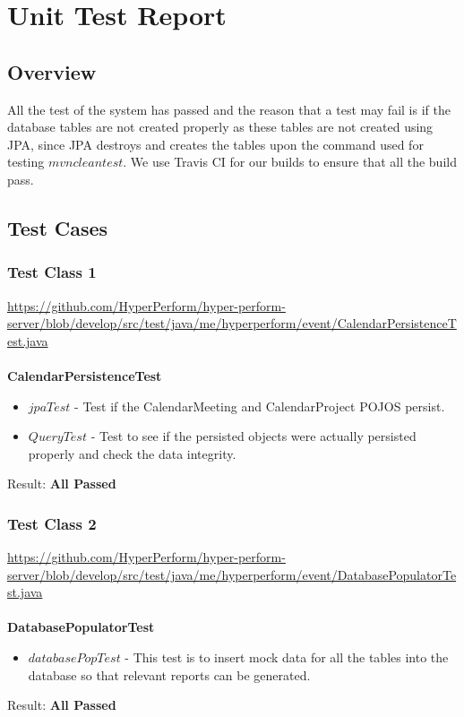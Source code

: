 \documentclass[11pt,a4paper]{article}
\begin{document}
\section{Unit Test Report}
\subsection{Overview}
All the test of the system has passed and the reason that a test may fail is if the database tables are not created properly as these tables are not created using JPA, since JPA destroys and creates the tables upon the command used for testing $mvn clean test$. We use Travis CI for our builds to ensure that all the build pass.

\subsection{Test Cases}

\subsubsection{Test Class 1}
	\url{https://github.com/HyperPerform/hyper-perform-server/blob/develop/src/test/java/me/hyperperform/event/CalendarPersistenceTest.java}\\\\
 \textbf{CalendarPersistenceTest}
 \begin{itemize}
 	\item $jpaTest$ - Test if the CalendarMeeting and CalendarProject POJOS persist.
	\item $QueryTest$ - Test to see if the persisted objects were actually persisted properly and check the data integrity.\\
\end{itemize}
Result: \textbf{All Passed}


\subsubsection{Test Class 2}
\url{https://github.com/HyperPerform/hyper-perform-server/blob/develop/src/test/java/me/hyperperform/event/DatabasePopulatorTest.java}\\\\
\textbf{DatabasePopulatorTest}
\begin{itemize}
	\item $databasePopTest$ - This test is to insert mock data for all the tables into the database so that relevant reports can be generated.\\
\end{itemize}
Result: \textbf{All Passed}
\end{document}
